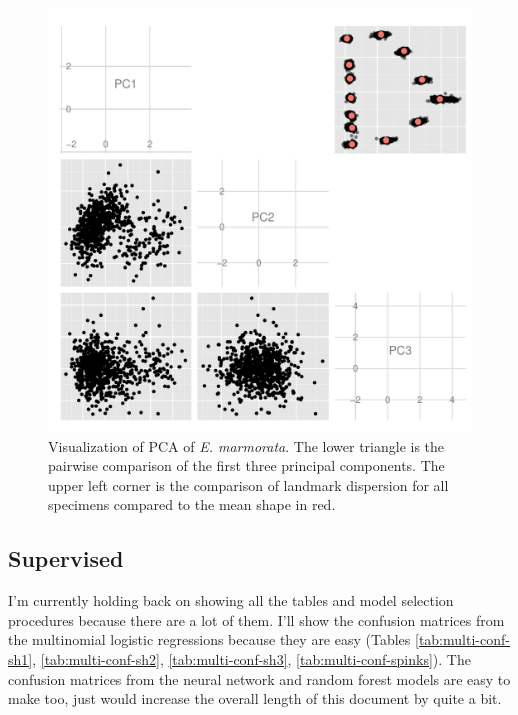 \documentclass{article}\usepackage{graphicx, color}
\begin{document}
\begin{figure}[ht]
  \centering
  \includegraphics[width = \textwidth]{figure/gm}
  \caption{Visualization of PCA of \textit{E. marmorata}. The lower triangle is the pairwise comparison of the first three principal components. The upper left corner is the comparison of landmark dispersion for all specimens compared to the mean shape in red.}
  \label{fig:gm}
\end{figure}


\subsection{Supervised}

I'm currently holding back on showing all the tables and model selection procedures because there are a lot of them. I'll show the confusion matrices from the multinomial logistic regressions because they are easy (Tables \ref{tab:multi-conf-sh1}, \ref{tab:multi-conf-sh2}, \ref{tab:multi-conf-sh3}, \ref{tab:multi-conf-spinks}). The confusion matrices from the neural network and random forest models are easy to make too, just would increase the overall length of this document by quite a bit.
\end{document}
